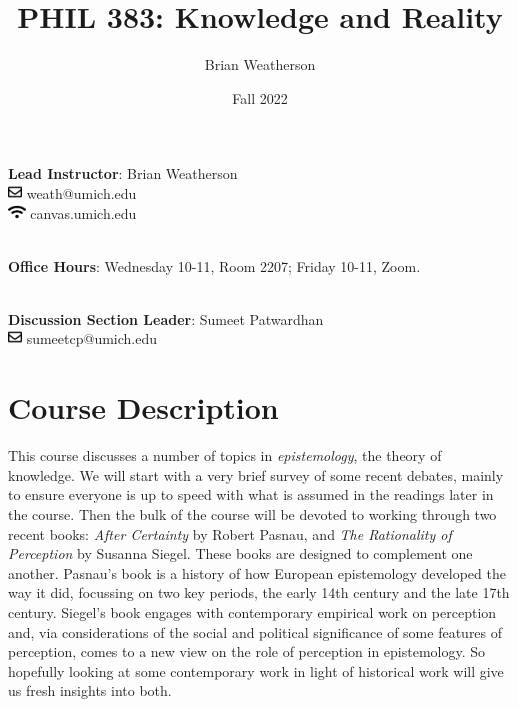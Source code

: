 \documentclass[
]{article}
\title{PHIL 383: Knowledge and Reality}
\author{Brian Weatherson}
\date{Fall 2022}
\begin{document}
\maketitle
\ifdefined\Shaded\renewenvironment{Shaded}{\begin{tcolorbox}[boxrule=0pt, frame hidden, sharp corners, borderline west={3pt}{0pt}{shadecolor}, interior hidden, enhanced, breakable]}{\end{tcolorbox}}\fi

\textbf{Lead Instructor}: Brian Weatherson\\
\includegraphics[width=1em,height=1em]{figs/fa-icon-851abd0b78479f510d18caf2daa1d792.pdf}
weath@umich.edu\\
\includegraphics[width=1.25em,height=1em]{figs/fa-icon-4afc4ec86e4719f7fac10dc1a986382a.pdf}
canvas.umich.edu\\
\strut \\
\textbf{Office Hours}: Wednesday 10-11, Room 2207; Friday 10-11, Zoom.\\
\strut \\
\textbf{Discussion Section Leader}: Sumeet Patwardhan\\
\includegraphics[width=1em,height=1em]{figs/fa-icon-851abd0b78479f510d18caf2daa1d792.pdf}
sumeetcp@umich.edu

\hypertarget{course-description}{%
\section{Course Description}\label{course-description}}

This course discusses a number of topics in \emph{epistemology}, the
theory of knowledge. We will start with a very brief survey of some
recent debates, mainly to ensure everyone is up to speed with what is
assumed in the readings later in the course. Then the bulk of the course
will be devoted to working through two recent books: \emph{After
Certainty} by Robert Pasnau, and \emph{The Rationality of Perception} by
Susanna Siegel. These books are designed to complement one another.
Pasnau's book is a history of how European epistemology developed the
way it did, focussing on two key periods, the early 14th century and the
late 17th century. Siegel's book engages with contemporary empirical
work on perception and, via considerations of the social and political
significance of some features of perception, comes to a new view on the
role of perception in epistemology. So hopefully looking at some
contemporary work in light of historical work will give us fresh
insights into both.
\end{document}
